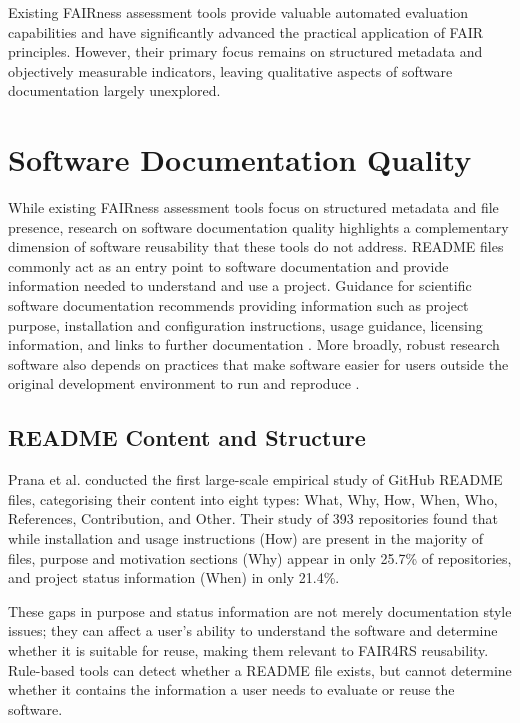 Existing FAIRness assessment tools provide valuable automated 
evaluation capabilities and have significantly advanced the practical 
application of FAIR principles. However, their primary focus remains 
on structured metadata and objectively measurable indicators, leaving 
qualitative aspects of software documentation largely unexplored.

\section{Software Documentation Quality}

While existing FAIRness assessment tools focus on structured metadata 
and file presence, research on software documentation quality 
highlights a complementary dimension of software reusability that 
these tools do not address. README files commonly act as an entry
point to software documentation and provide information needed to
understand and use a project. Guidance for scientific software
documentation recommends providing information such as project
purpose, installation and configuration instructions, usage guidance,
licensing information, and links to further documentation
\cite{lee2018documentation}. More broadly, robust research software
also depends on practices that make software easier for users outside
the original development environment to run and reproduce
\cite{taschuk2017robust}.

\subsection{README Content and Structure}

Prana et al. \cite{prana2019readme} conducted the first large-scale 
empirical study of GitHub README files, categorising their content 
into eight types: What, Why, How, When, Who, References, Contribution, 
and Other. Their study of 393 repositories found that while 
installation and usage instructions (How) are present in the majority 
of files, purpose and motivation sections (Why) appear in only 25.7\% 
of repositories, and project status information (When) in only 21.4\%.

These gaps in purpose and status information are not merely
documentation style issues; they can affect a user's ability to
understand the software and determine whether it is suitable for
reuse, making them relevant to FAIR4RS reusability. Rule-based tools can detect whether 
a README file exists, but cannot determine whether it contains the 
information a user needs to evaluate or reuse the software.

